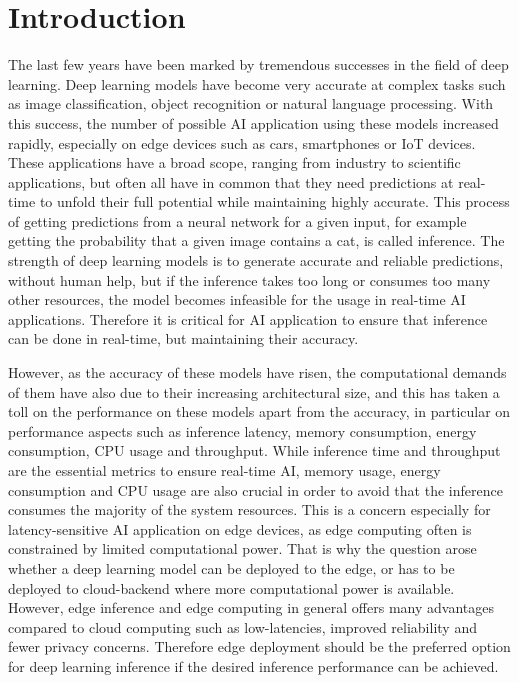 \chapter{Introduction}


The last few years have been marked by tremendous successes in the field of deep learning.
Deep learning models have become very accurate at complex tasks such as image classification, object recognition or natural language processing. 
With this success, the number of possible AI application using these models increased rapidly, especially on edge devices such as cars, smartphones or IoT devices.
These applications have a broad scope, ranging from industry to scientific applications, but often all have in common that they need predictions at real-time to unfold their full potential while maintaining highly accurate.
This process of getting predictions from a neural network for a given input, for example getting the probability that a given image contains a cat, is called inference.
The strength of deep learning models is to generate accurate and reliable predictions, without human help, but if the inference takes too long or consumes too many other resources, the model becomes infeasible for the usage in real-time AI applications.
Therefore it is critical for AI application to ensure that inference can be done in real-time, but maintaining their accuracy.

However, as the accuracy of these models have risen, the computational demands of them have also due to their increasing architectural size, and this has taken a toll on the performance on these models apart from the accuracy, in particular on performance aspects such as inference latency, memory consumption, energy consumption, CPU usage and throughput. 
While inference time and throughput are the essential metrics to ensure real-time AI, memory usage, energy consumption and CPU usage are also crucial in order to avoid that the inference consumes the majority of the system resources.
This is a concern especially for latency-sensitive AI application on edge devices, as edge computing often is constrained by limited computational power. 
That is why the question arose whether a deep learning model can be deployed to the edge, or has to be deployed to cloud-backend where more computational power is available.
However, edge inference and edge computing in general offers many advantages compared to cloud computing such as low-latencies, improved reliability and fewer privacy concerns\cite{Mor:2018:EC:3305263.3313377}.
Therefore edge deployment should be the preferred option for deep learning inference if the desired inference performance can be achieved.



